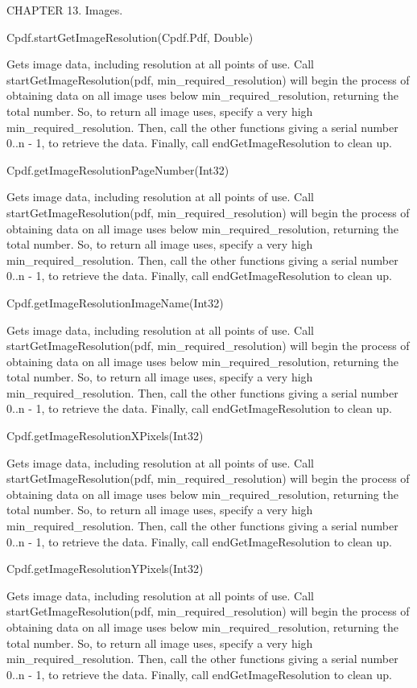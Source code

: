 CHAPTER 13. Images.

Cpdf.startGetImageResolution(Cpdf.Pdf, Double)


Gets image data, including resolution at all points of use. Call
startGetImageResolution(pdf, min_required_resolution) will begin the
process of obtaining data on all image uses below min_required_resolution, 
returning the total number. So, to return all image uses, specify a very
high min_required_resolution. Then, call the other functions giving a
serial number 0..n - 1, to retrieve the data. Finally, call
endGetImageResolution to clean up.


Cpdf.getImageResolutionPageNumber(Int32)


Gets image data, including resolution at all points of use. Call
startGetImageResolution(pdf, min_required_resolution) will begin the
process of obtaining data on all image uses below min_required_resolution, 
returning the total number. So, to return all image uses, specify a very
high min_required_resolution. Then, call the other functions giving a
serial number 0..n - 1, to retrieve the data. Finally, call
endGetImageResolution to clean up.


Cpdf.getImageResolutionImageName(Int32)


Gets image data, including resolution at all points of use. Call
startGetImageResolution(pdf, min_required_resolution) will begin the
process of obtaining data on all image uses below min_required_resolution, 
returning the total number. So, to return all image uses, specify a very
high min_required_resolution. Then, call the other functions giving a
serial number 0..n - 1, to retrieve the data. Finally, call
endGetImageResolution to clean up.


Cpdf.getImageResolutionXPixels(Int32)


Gets image data, including resolution at all points of use. Call
startGetImageResolution(pdf, min_required_resolution) will begin the
process of obtaining data on all image uses below min_required_resolution, 
returning the total number. So, to return all image uses, specify a very
high min_required_resolution. Then, call the other functions giving a
serial number 0..n - 1, to retrieve the data. Finally, call
endGetImageResolution to clean up.


Cpdf.getImageResolutionYPixels(Int32)


Gets image data, including resolution at all points of use. Call
startGetImageResolution(pdf, min_required_resolution) will begin the
process of obtaining data on all image uses below min_required_resolution, 
returning the total number. So, to return all image uses, specify a very
high min_required_resolution. Then, call the other functions giving a
serial number 0..n - 1, to retrieve the data. Finally, call
endGetImageResolution to clean up.



